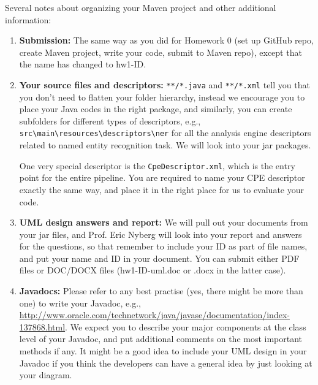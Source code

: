 \documentclass[oneside]{memoir}
\begin{document}
\begin{titlingpage}
\begin{minipage}{1.2\textwidth}
\begin{itemize}
\begin{verbatim}
\end{verbatim}
\normalsize

\end{itemize}

\end{minipage}
\hspace{-0.1\textwidth}

\hspace{-0.1\textwidth}
\begin{minipage}{1.2\textwidth}

Several notes about organizing your Maven project and other additional
information:

\begin{enumerate}

\item \textbf{Submission:} The same way as you did for Homework 0 (set up GitHub
repo, create Maven project, write your code, submit to Maven repo), except that
the name has changed to hw1-ID.

\item \textbf{Your source files and descriptors:} \verb|**/*.java| and
\verb|**/*.xml| tell you that you don't need to flatten your folder hierarchy,
instead we encourage you to place your Java codes in the right package, and
similarly, you can create subfolders for different types of descriptors, e.g.,
\verb|src\main\resources\descriptors\ner| for all the analysis engine
descriptors related to named entity recognition task. We will look into your jar
packages.

One very special descriptor is the \verb|CpeDescriptor.xml|, which is the entry
point for the entire pipeline. You are required to name your CPE descriptor
exactly the same way, and place it in the right place for us to evaluate your
code.

\item \textbf{UML design answers and report:} We will pull out your documents
from your jar files, and Prof. Eric Nyberg will look into your report and
answers for the questions, so that remember to include your ID as part of file
names, and put your name and ID in your document. You can submit either PDF
files or DOC/DOCX files (hw1-ID-uml.doc or .docx in the latter case).

\item \textbf{Javadocs:} Please refer to any best practise (yes, there might be
more than one) to write your Javadoc, e.g.,
\url{http://www.oracle.com/technetwork/java/javase/documentation/index-137868.html}.
We expect you to describe your major components at the class level of your
Javadoc, and put additional comments on the most important methods if any. It
might be a good idea to include your UML design in your Javadoc if you think the
developers can have a general idea by just looking at your diagram.


\end{enumerate}
\end{minipage}
\end{titlingpage}
\end{document}
